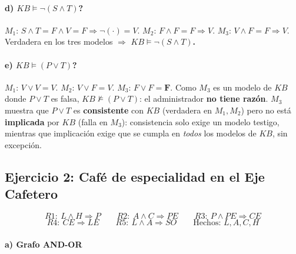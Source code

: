 \paragraph{d) $KB \models \neg(S\land T)$?}
$M_1$: $S\land T = F\land V=F\Rightarrow\neg(\cdot)=V$. $M_2$: $F\land F=F\Rightarrow V$. $M_3$:
$V\land F=F\Rightarrow V$. Verdadera en los tres modelos $\Rightarrow$ \textbf{$KB \models
\neg(S\land T)$.}

\paragraph{e) $KB \models (P\lor T)$?}
$M_1$: $V\lor V=V$. $M_2$: $V\lor F=V$. $M_3$: $F\lor F=\textbf{F}$. Como $M_3$ es un modelo de $KB$
donde $P\lor T$ es falsa, \textbf{$KB \not\models (P\lor T)$}: el administrador \textbf{no tiene
razón}. $M_3$ muestra que $P\lor T$ es \textbf{consistente} con $KB$ (verdadera en $M_1,M_2$) pero no
está \textbf{implicada} por $KB$ (falla en $M_3$): consistencia solo exige un modelo testigo,
mientras que implicación exige que se cumpla en \emph{todos} los modelos de $KB$, sin excepción.

\subsection{Ejercicio 2: Café de especialidad en el Eje Cafetero}

\[
    R1:\ L\land H\Rightarrow P \qquad R2:\ A\land C\Rightarrow PE \qquad R3:\ P\land PE\Rightarrow CE
\]
\[
    R4:\ CE\Rightarrow LE \qquad R5:\ L\land A\Rightarrow SO \qquad \text{Hechos: } L,A,C,H
\]

\paragraph{a) Grafo AND-OR}

